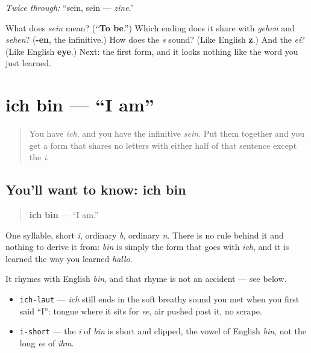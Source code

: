 \emph{Twice through:} \textquotedblleft{}sein, sein — \emph{zine}.\textquotedblright{}

\begin{tcolorbox}[breakable,colback=teal!4,colframe=teal!35!black,title={Before you move on}]
What does \emph{sein} mean? (\textquotedblleft{}\textbf{To be}.\textquotedblright{}) Which ending does it share with \emph{gehen} and \emph{sehen}? (\textbf{-en}, the infinitive.) How does the \emph{s} sound? (Like English \textbf{z}.) And the \emph{ei}? (Like English \textbf{eye}.) Next: the first form, and it looks nothing like the word you just learned.
\end{tcolorbox}
\section[ich bin]{ich bin — \textquotedblleft{}I am\textquotedblright{}}

\label{lesson:GE-C16-ich-bin}



\begin{quote}
You have \emph{ich}, and you have the infinitive \emph{sein}. Put them together and you get a form that shares no letters with either half of that sentence except the \emph{i}.
\end{quote}

\subsection*{You'll want to know: ich bin}
\begin{quote}
\textbf{ich bin} — \textquotedblleft{}I am.\textquotedblright{}
\end{quote}

One syllable, short \emph{i}, ordinary \emph{b}, ordinary \emph{n}. There is no rule behind it and nothing to derive it from: \emph{bin} is simply the form that goes with \emph{ich}, and it is learned the way you learned \emph{hallo}.

It rhymes with English \emph{bin}, and that rhyme is not an accident — see below.

\begin{sounds}
\begin{itemize}
\raggedright
  \item \texttt{ich-laut} — \emph{ich} still ends in the soft breathy sound you met when you first said \textquotedblleft{}I\textquotedblright{}: tongue where it sits for \emph{ee}, air pushed past it, no scrape.
  \item \texttt{i-short} — the \emph{i} of \emph{bin} is short and clipped, the vowel of English \emph{bin}, not the long \emph{ee} of \emph{ihm}.
\end{itemize}
\end{sounds}

